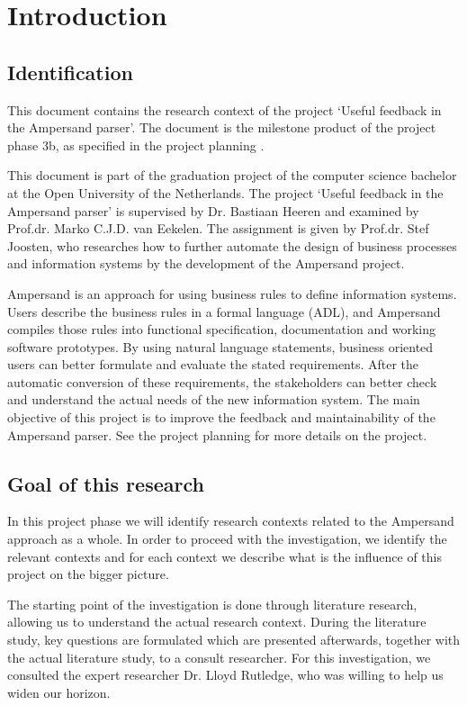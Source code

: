 
\section{Introduction}
\subsection{Identification}
This document contains the research context of the project `Useful feedback in the Ampersand parser'.
The document is the milestone product of the project phase 3b, as specified in the project planning .

This document is part of the graduation project of the computer science bachelor at the Open University of the Netherlands.
The project `Useful feedback in the Ampersand parser' is supervised by Dr. Bastiaan Heeren and examined by Prof.dr. Marko C.J.D. van Eekelen.
The assignment is given by Prof.dr. Stef Joosten, who researches how to further automate the design of business processes and information systems by the development of the Ampersand project.

Ampersand is an approach for using business rules to define information systems.
Users describe the business rules in a formal language (ADL), and Ampersand compiles those rules into functional specification, documentation and working software prototypes. 
By using natural language statements, business oriented users can better formulate and evaluate the stated requirements.
After the automatic conversion of these requirements, the stakeholders can better check and understand the actual needs of the new information system.
The main objective of this project is to improve the feedback and maintainability of the Ampersand parser.
See the project planning  for more details on the project.

\subsection{Goal of this research}
In this project phase we will identify research contexts related to the Ampersand approach as a whole.
In order to proceed with the investigation, we identify the relevant contexts and for each context we describe what is the influence of this project on the bigger picture.

The starting point of the investigation is done through literature research, allowing us to understand the actual research context.
During the literature study, key questions are formulated which are presented afterwards, together with the actual literature study, to a consult researcher.
For this investigation, we consulted the expert researcher Dr. Lloyd Rutledge, who was willing to help us widen our horizon.

